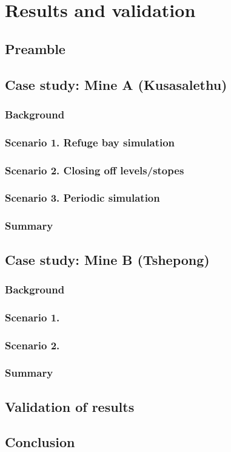 \chapter{Results and validation}
\section{Preamble}
\section{Case study: Mine A \color{blue}(Kusasalethu)}
	\subsection{Background}
	\subsection{Scenario 1. Refuge bay simulation}
	\subsection{Scenario 2. Closing off levels/stopes}
	\subsection{Scenario 3. Periodic simulation}
	\subsection{Summary}
\section{Case study: Mine B \color{blue}(Tshepong)}
	\subsection{Background}
	\subsection{Scenario 1.}
	\subsection{Scenario 2. }
	\subsection{Summary}
\section{Validation of results}
\section{Conclusion}